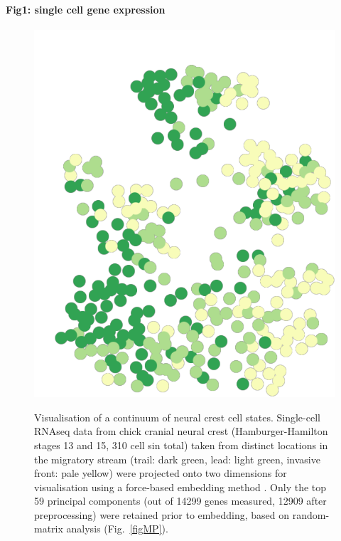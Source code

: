 \documentclass[review]{elsarticle}
\begin{document}
\paragraph{Fig1: single cell gene expression}
\begin{figure}
\centering
{\includegraphics[scale=0.25]{Neural_Crest_NC_59PCs_HH1315}}
\caption{Visualisation of a continuum of neural crest cell states. Single-cell RNAseq data \cite{Morrison2017} from chick cranial neural crest (Hamburger-Hamilton stages 13 and 15, 310 cell sin total) taken from distinct locations in the migratory stream (trail: dark green, lead: light green, invasive front: pale yellow) were projected onto two dimensions for visualisation using a force-based embedding method \cite{Weinreb2018}. Only the top 59 principal components (out of 14299 genes measured, 12909 after preprocessing) were retained prior to embedding, based on random-matrix analysis \cite{Aparicio2018} (Fig.~\ref{figMP}).\label{figscRNAseq}}
\end{figure}
\end{document}

